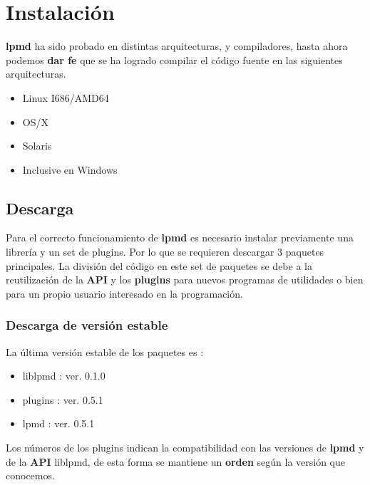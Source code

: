 \documentclass[a4paper,10pt]{scrbook}
\newcommand{\lpmd}{\textbf{lpmd }}
\begin{document}
\chapter{Instalaci\'on}
\label{chap:inst}

\lpmd ha sido probado en distintas arquitecturas, y compiladores, hasta ahora podemos \textbf{dar fe} que se ha logrado compilar el c\'odigo fuente en las siguientes arquitecturas.

\begin{itemize}
 \item Linux I686/AMD64
 \item OS/X
 \item Solaris
 \item Inclusive en Windows
\end{itemize}

\section{Descarga}

Para el correcto funcionamiento de \lpmd es necesario instalar previamente una librer\'ia y un set de plugins. Por lo que se requieren descargar 3 paquetes principales. La divisi\'on del c\'odigo en este set de paquetes se debe a la reutilizaci\'on de la \textbf{API} y los \textbf{plugins} para nuevos programas de utilidades o bien para un propio usuario interesado en la programaci\'on.

\subsection{Descarga de versi\'on estable}

La \'ultima versi\'on estable de los paquetes es :

\begin{itemize}
 \item liblpmd : ver. 0.1.0
 \item plugins : ver. 0.5.1
 \item lpmd    : ver. 0.5.1
\end{itemize}

Los n\'umeros de los plugins indican la compatibilidad con las versiones de \lpmd y de la \textbf{API} liblpmd, de esta forma se mantiene un \textbf{orden} seg\'un la versi\'on que conocemos.

\end{document}
